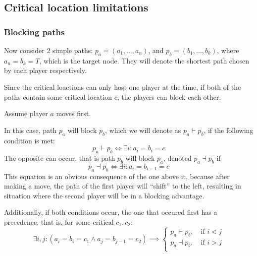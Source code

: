 \documentclass[12pt]{article}
\begin{document}
\subsection{Critical location limitations}

\subsubsection{Blocking paths}

Now consider 2 simple paths: $p_a = (a_1, \ldots, a_n)$, and $p_b = (b_1, \ldots, b_k)$, where $a_n = b_k = T$, which is the target node.
They will denote the shortest path chosen by each player respectively.

Since the critical loactions can only host one player at the time,
if both of the paths contain some critical location $c$, the players can block each other.

Assume player $a$ moves first.

In this case, path $p_a$ will block $p_b$, which we will denote as $p_a \vdash p_b$, if the following condition is met:
\begin{equation}
    p_a \vdash p_b \iff \exists i : a_i = b_i = c
\end{equation}
The opposite can occur, that is path $p_b$ will block $p_a$, denoted $p_a \dashv p_b$ if
\begin{equation}
    p_a \dashv p_b \iff \exists i : a_i = b_{i-1} = c
\end{equation}
This equation is an obvious consequence of the one above it, because after making a move, the path of the first player will ``shift'' to the left,
resulting in situation where the second player will be in a blocking advantage.

Additionally, if both conditions occur,
the one that occured first has a precedence,
that is, for some critical $c_1, c_2$:
\begin{equation}
    \exists i,j : (a_i = b_i = c_1 \land a_j = b_{j-1} = c_2) \implies
    \begin{cases}
        p_a \vdash p_b, \quad \text{if $i < j$} \\
        p_a \dashv p_b, \quad \text{if $i > j$} \\
    \end{cases}
\end{equation}
\end{document}
